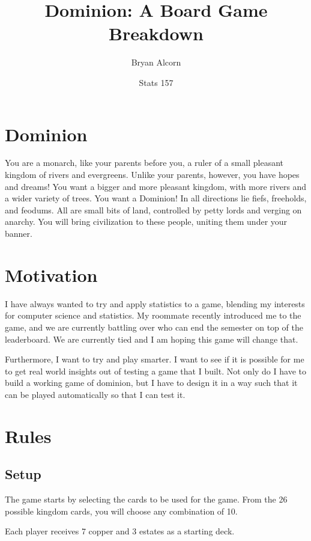\documentclass[11pt, oneside]{article}   	%
\title{Dominion: A Board Game Breakdown}
\author{Bryan Alcorn}
\date{Stats 157}							%
\begin{document}
\maketitle

\section{Dominion}

You are a monarch, like your parents before you, a ruler of a small pleasant kingdom of rivers and evergreens.
Unlike your parents, however, you have hopes and dreams!
You want a bigger and more pleasant kingdom, with more rivers and a wider variety of trees.
You want a Dominion! In all directions lie fiefs, freeholds, and feodums.
All are small bits of land, controlled by petty lords and verging on anarchy.
You will bring civilization to these people, uniting them under your banner.

\section{Motivation}

I have always wanted to try and apply statistics to a game, blending my interests for computer science and statistics. My roommate recently introduced me to the game, and we are currently battling over who can end the semester on top of the leaderboard. We are currently tied and I am hoping this game will change that. 

Furthermore, I want to try and play smarter. I want to see if it is possible for me to get real world insights out of testing a game that I built. Not only do I have to build a working game of dominion, but I have to design it in a way such that it can be played automatically so that I can test it. 

\section{Rules}

\subsection{Setup}

The game starts by selecting the cards to be used for the game. From the 26 possible kingdom cards, you will choose any combination of 10. 

Each player receives 7 copper and 3 estates as a starting deck.
\end{document}
